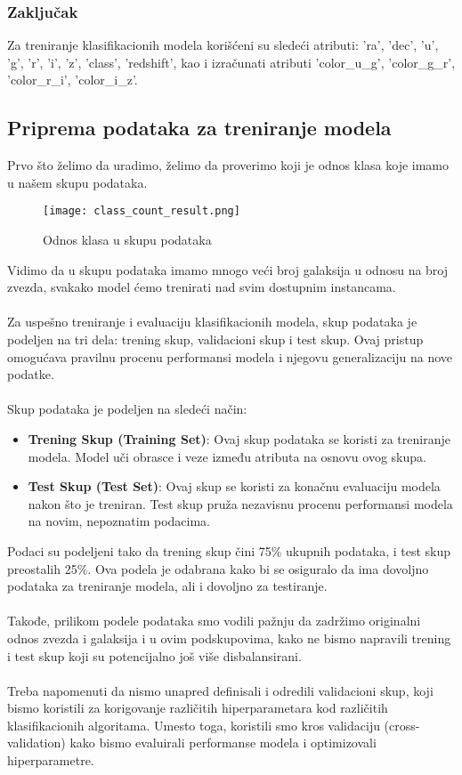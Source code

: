 \documentclass[a4paper,12pt]{article}
\begin{document}
\subsubsection{Zaključak}
Za treniranje klasifikacionih modela korišćeni su sledeći atributi: 'ra', 'dec', 'u', 'g', 'r', 'i', 'z', 'class', 'redshift', kao i izračunati atributi 'color\_u\_g', 'color\_g\_r', 'color\_r\_i', 'color\_i\_z'.

\clearpage


\subsection{Priprema podataka za treniranje modela}

Prvo što želimo da uradimo, želimo da proverimo koji je odnos klasa koje imamo u našem skupu podataka.

\begin{figure}[h!]
\centering
\texttt{[image: class\_count\_result.png]}
\caption{Odnos klasa u skupu podataka}
\label{fig:sql_query}
\end{figure}

Vidimo da u skupu podataka imamo mnogo veći broj galaksija u odnosu na broj zvezda, svakako model ćemo trenirati nad svim dostupnim instancama.
\\\\Za uspešno treniranje i evaluaciju klasifikacionih modela, skup podataka je podeljen na tri dela: trening skup, validacioni skup i test skup. Ovaj pristup omogućava pravilnu procenu performansi modela i njegovu generalizaciju na nove podatke.
\\\\Skup podataka je podeljen na sledeći način:
\begin{itemize}
    \item \textbf{Trening Skup (Training Set)}: Ovaj skup podataka se koristi za treniranje modela. Model uči obrasce i veze između atributa na osnovu ovog skupa.
    \item \textbf{Test Skup (Test Set)}: Ovaj skup se koristi za konačnu evaluaciju modela nakon što je treniran. Test skup pruža nezavisnu procenu performansi modela na novim, nepoznatim podacima.
\end{itemize}

Podaci su podeljeni tako da trening skup čini 75\% ukupnih podataka, i test skup preostalih 25\%. Ova podela je odabrana kako bi se osiguralo da ima dovoljno podataka za treniranje modela, ali i dovoljno za testiranje.\\\\
Takođe, prilikom podele podataka smo vodili pažnju da zadržimo originalni odnos zvezda i galaksija i u ovim podskupovima, kako ne bismo napravili trening i test skup koji su potencijalno još više disbalansirani.\\\\
Treba napomenuti da nismo unapred definisali i odredili validacioni skup, koji bismo koristili za korigovanje različitih hiperparametara kod različitih klasifikacionih algoritama. Umesto toga, koristili smo kros validaciju (cross-validation) kako bismo evaluirali performanse modela i optimizovali hiperparametre.
\end{document}
